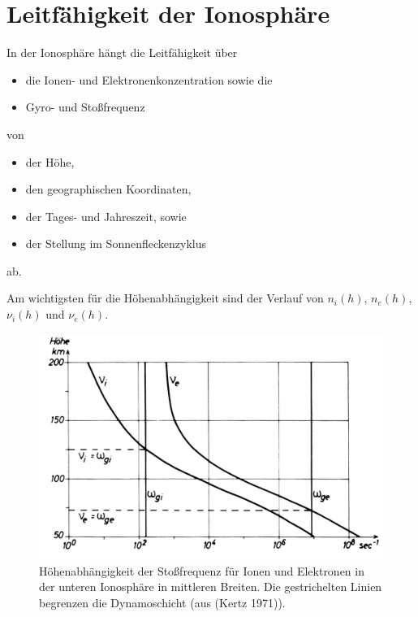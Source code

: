 \documentclass[
  a4paper,
  DIV=11]{scrreprt}
\providecommand{\tightlist}{%
  \setlength{\itemsep}{0pt}\setlength{\parskip}{0pt}}\usepackage{longtable,booktabs,array}
\begin{document}
\hypertarget{leitfuxe4higkeit-der-ionosphuxe4re}{%
\section{Leitfähigkeit der
Ionosphäre}\label{leitfuxe4higkeit-der-ionosphuxe4re}}

In der Ionosphäre hängt die Leitfähigkeit über

\begin{itemize}
\tightlist
\item
  die Ionen- und Elektronenkonzentration sowie die
\item
  Gyro- und Stoßfrequenz
\end{itemize}

von

\begin{itemize}
\tightlist
\item
  der Höhe,
\item
  den geographischen Koordinaten,
\item
  der Tages- und Jahreszeit, sowie
\item
  der Stellung im Sonnenfleckenzyklus
\end{itemize}

ab.

Am wichtigsten für die Höhenabhängigkeit sind der Verlauf von
\(n_i(h)\), \(n_e(h)\), \(\nu_i(h)\) und \(\nu_e(h)\).

\begin{figure}

{\centering \includegraphics{./images/hoehenabh_stossfreq.png}

}

\caption{Höhenabhängigkeit der Stoßfrequenz für Ionen und Elektronen in
der unteren Ionosphäre in mittleren Breiten. Die gestrichelten Linien
begrenzen die Dynamoschicht (aus (Kertz 1971)).}

\end{figure}
\end{document}
